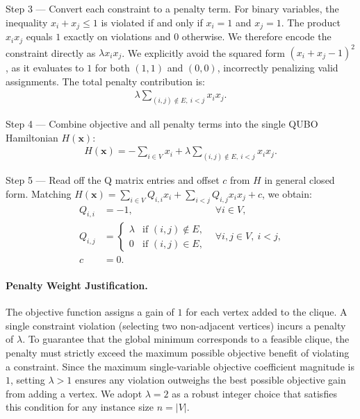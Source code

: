\documentclass[12pt]{article}
\begin{document}
Step 3 --- Convert each constraint to a penalty term. For binary variables, the inequality $x_i + x_j \le 1$ is violated if and only if $x_i = 1$ and $x_j = 1$. The product $x_i x_j$ equals $1$ exactly on violations and $0$ otherwise. We therefore encode the constraint directly as $\lambda x_i x_j$. We explicitly avoid the squared form $(x_i + x_j - 1)^2$, as it evaluates to $1$ for both $(1,1)$ and $(0,0)$, incorrectly penalizing valid assignments. The total penalty contribution is:
\begin{align}
  \lambda \sum_{(i,j) \notin E, \ i < j} x_i x_j.
\end{align}

Step 4 --- Combine objective and all penalty terms into the single QUBO Hamiltonian $H(\mathbf{x})$:
\begin{align}
  H(\mathbf{x}) = -\sum_{i \in V} x_i + \lambda \sum_{(i,j) \notin E, \ i < j} x_i x_j.
\end{align}

Step 5 --- Read off the Q matrix entries and offset $c$ from $H$ in general closed form. Matching $H(\mathbf{x}) = \sum_{i \in V} Q_{i,i} x_i + \sum_{i < j} Q_{i,j} x_i x_j + c$, we obtain:
\begin{align}
  Q_{i,i} &= -1, & \forall i \in V, \\
  Q_{i,j} &= \begin{cases} \lambda & \text{if } (i,j) \notin E, \\ 0 & \text{if } (i,j) \in E, \end{cases} & \forall i, j \in V, \ i < j, \\
  c &= 0.
\end{align}

\paragraph{Penalty Weight Justification.}
The objective function assigns a gain of $1$ for each vertex added to the clique. A single constraint violation (selecting two non-adjacent vertices) incurs a penalty of $\lambda$. To guarantee that the global minimum corresponds to a feasible clique, the penalty must strictly exceed the maximum possible objective benefit of violating a constraint. Since the maximum single-variable objective coefficient magnitude is $1$, setting $\lambda > 1$ ensures any violation outweighs the best possible objective gain from adding a vertex. We adopt $\lambda = 2$ as a robust integer choice that satisfies this condition for any instance size $n = |V|$.
\end{document}

